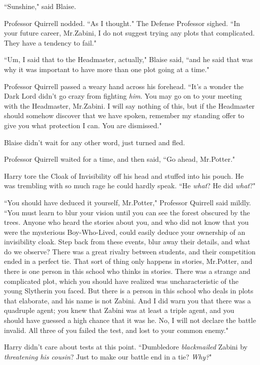 ``Sunshine," said Blaise.

Professor Quirrell nodded. ``As I thought." The Defense Professor sighed. ``In your future career, Mr.\?Zabini, I do not suggest trying any plots that complicated. They have a tendency to fail."

``Um, I said that to the Headmaster, actually," Blaise said, ``and he said that was why it was important to have more than one plot going at a time."

Professor Quirrell passed a weary hand across his forehead. ``It's a wonder the Dark Lord didn't go crazy from fighting \emph{him}. You may go on to your meeting with the Headmaster, Mr.\?Zabini. I will say nothing of this, but if the Headmaster should somehow discover that we have spoken, remember my standing offer to give you what protection I can. You are dismissed."

Blaise didn't wait for any other word, just turned and fled.

\later

Professor Quirrell waited for a time, and then said, ``Go ahead, Mr.\?Potter."

Harry tore the Cloak of Invisibility off his head and stuffed into his pouch. He was trembling with so much rage he could hardly speak. ``He \emph{what}? He did \emph{what}?"

``You should have deduced it yourself, Mr.\?Potter," Professor Quirrell said mildly. ``You must learn to blur your vision until you can see the forest obscured by the trees. Anyone who heard the stories about you, and who did not know that you were the mysterious Boy-Who-Lived, could easily deduce your ownership of an invisibility cloak. Step back from these events, blur away their details, and what do we observe? There was a great rivalry between students, and their competition ended in a perfect tie. That sort of thing only happens in stories, Mr.\?Potter, and there is one person in this school who thinks in stories. There was a strange and complicated plot, which you should have realized was uncharacteristic of the young Slytherin you faced. But there is a person in this school who deals in plots that elaborate, and his name is not Zabini. And I did warn you that there was a quadruple agent; you knew that Zabini was at least a triple agent, and you should have guessed a high chance that it was he. No, I will not declare the battle invalid. All three of you failed the test, and lost to your common enemy."

Harry didn't care about tests at this point. ``Dumbledore \emph{blackmailed} Zabini by \emph{threatening his cousin}? Just to make our battle end in a tie? \emph{Why?}"

